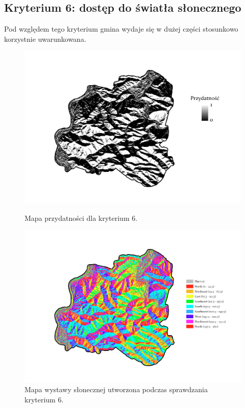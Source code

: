 \documentclass{article}
\begin{document}
\subsection{Kryterium 6: dostęp do światła słonecznego}
Pod względem tego kryterium gmina wydaje się w dużej części stosunkowo korzystnie uwarunkowana.

\begin{figure}[H]
    \begin{minipage}[t]{0.48\textwidth}
        \centering
        \includegraphics[width=\linewidth]{img/plesna-kryterium6-layout.jpg}
        \caption{Mapa przydatności dla kryterium 6.}
        \label{fig:kryterium6-layout}
    \end{minipage}
    \hfill
    \begin{minipage}[t]{0.48\textwidth}
        \centering
        \includegraphics[width=\linewidth]{img/plesna-kryterium6-aspect.jpg}
        \caption{Mapa wystawy słonecznej utworzona podczas sprawdzania kryterium 6.}
        \label{fig:kryterium6-aspect}
    \end{minipage}
\end{figure}
\end{document}
